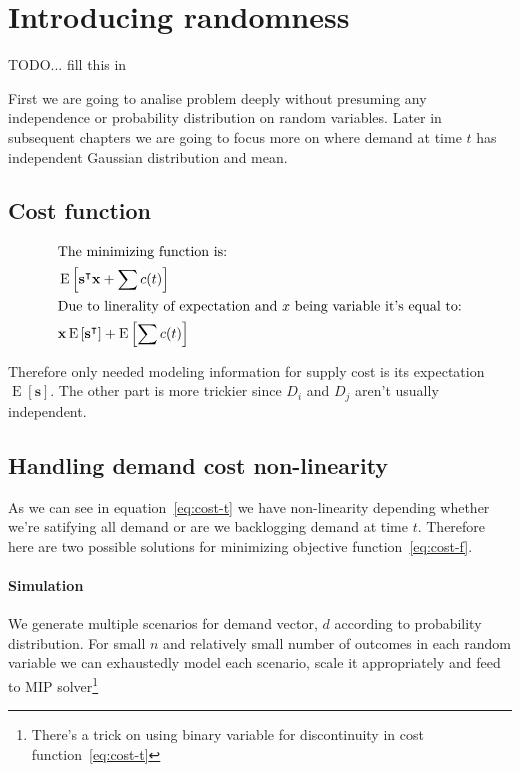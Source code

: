 
\chapter{Introducing randomness}
\label{chap:solution-randomness}

TODO... fill this in

First we are going to analise problem deeply without presuming any independence or probability distribution on random variables. Later in subsequent chapters we are going to focus more on where demand at time $t$ has independent Gaussian distribution and mean.

\section{Cost function}
\begin{align*}
\shortintertext{The minimizing function is:}
    & \operatorname{E} \left[
        \mathbf{s}^\intercal\mathbf{x} + \sum{c(t)}
    \right] \\
\shortintertext{Due to linerality of expectation and $x$ being variable it's equal to:}
    & \mathbf{x} \operatorname{E} \left[
        \mathbf{s}^\intercal
        \right] +
        \operatorname{E} \left[ \sum{c(t)} \right] \\
\end{align*}

Therefore only needed modeling information for supply cost is its expectation $\operatorname{E} \left[ \mathbf{s} \right]$. The other part is more trickier since $D_i$ and $D_j$ aren't usually independent.

\section{Handling demand cost non-linearity}
\label{sec:Handling demand cost non-linearity}

As we can see in equation~\ref{eq:cost-t} we have non-linearity depending whether we're satifying all demand or are we backlogging demand at time $t$. Therefore here are two possible solutions for minimizing objective function~\ref{eq:cost-f}.

\subsubsection{Simulation}
\label{subs:Simulation}

We generate multiple scenarios for demand vector, $d$ according to probability distribution. For small $n$ and relatively small number of outcomes in each random variable we can exhaustedly model each scenario, scale it appropriately and feed to MIP solver\footnote{There's a trick on using binary variable for discontinuity in cost function~\ref{eq:cost-t}}

